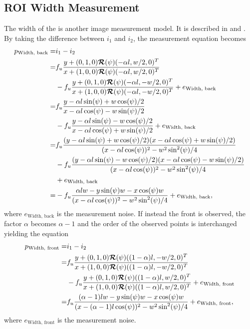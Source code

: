\subsection{ROI Width Measurement}
The width of the \abbrROI is another image measurement model.
It is described in  and .
By taking the difference between $i_1$ and $i_2$, the measurement equation becomes
%
\begin{equation}
\begin{split}
    p_{\text{Width, back}} = &i_1 - i_2 \\
    = &f_u \frac{y + (0,1,0) \bm{\mathcal{R}}(\psi) (- \alpha l,w/2,0)^T}{x + (1,0,0) \bm{\mathcal{R}}(\psi) (- \alpha l,w/2,0)^T} \\
    &- f_u \frac{y + (0,1,0) \bm{\mathcal{R}}(\psi) (- \alpha l,-w/2,0)^T}{x + (1,0,0) \bm{\mathcal{R}}(\psi) (- \alpha l,-w/2,0)^T} + e_ {\text{Width, back}} \\
    = &f_u \frac{y - \alpha l \sin(\psi) + w \cos(\psi) / 2}{x - \alpha l \cos(\psi) - w \sin(\psi) / 2} \\
    &- f_u \frac{y - \alpha l \sin(\psi) - w \cos(\psi) / 2}{x - \alpha l \cos(\psi) + w \sin(\psi) / 2} + e_ {\text{Width, back}} \\
    = &f_u \frac{(y - \alpha l \sin(\psi) + w \cos(\psi) / 2)(x - \alpha l \cos(\psi) + w \sin(\psi) / 2)}{(x - \alpha l \cos(\psi))^2 - w^2 \sin^2(\psi) / 4} \\
    &- f_u\frac{(y - \alpha l \sin(\psi) - w \cos(\psi) / 2)(x - \alpha l \cos(\psi) - w \sin(\psi) / 2)}{(x -  \alpha l \cos(\psi))^2 - w^2 \sin^2(\psi) / 4} \\
    &+ e_ {\text{Width, back}} \\
    = &-f_u \frac{\alpha l w - y \sin(\psi) w - x \cos(\psi) w}{(x - \alpha l \cos(\psi))^2 - w^2 \sin^2(\psi) / 4} + e_ {\text{Width, back}},
\end{split}
\end{equation}
%
where $e_ {\text{Width, back}}$ is the measurement noise.
If instead the front is observed, the factor $\alpha$ becomes $\alpha - 1$ and the order of the observed points is interchanged yielding the equation
%
\begin{equation}
\begin{split}
    p_{\text{Width, front}} = &i_1 - i_2 \\
    = &f_u \frac{y + (0,1,0) \bm{\mathcal{R}}(\psi) ((1-\alpha)l,-w/2,0)^T}{x + (1,0,0) \bm{\mathcal{R}}(\psi) ((1-\alpha)l,-w/2,0)^T} \\
    &- f_u\frac{y + (0,1,0) \bm{\mathcal{R}}(\psi) ((1-\alpha)l,w/2,0)^T}{x + (1,0,0) \bm{\mathcal{R}}(\psi) ((1-\alpha)l,w/2,0)^T} + e_ {\text{Width, front}} \\
    = &f_u \frac{(\alpha-1) l w - y \sin(\psi) w - x \cos(\psi) w}{(x - (\alpha-1) l \cos(\psi))^2 - w^2 \sin^2(\psi) / 4} + e_ {\text{Width, front}},
\end{split}
\end{equation}
%
where $e_{\text{Width, front}}$ is the measurement noise.

